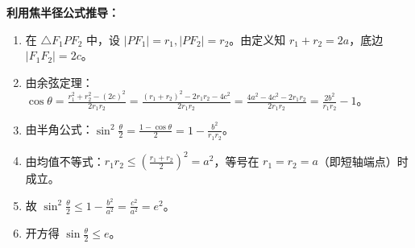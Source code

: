 \begin{proofbox}
\textbf{利用焦半径公式推导：}
\begin{enumerate}
    \item 在 $\triangle F_1PF_2$ 中，设 $|PF_1|=r_1, |PF_2|=r_2$。由定义知 $r_1+r_2=2a$，底边 $|F_1F_2|=2c$。
    \item 由余弦定理：$\cos\theta = \frac{r_1^2 + r_2^2 - (2c)^2}{2r_1r_2} = \frac{(r_1+r_2)^2 - 2r_1r_2 - 4c^2}{2r_1r_2} = \frac{4a^2 - 4c^2 - 2r_1r_2}{2r_1r_2} = \frac{2b^2}{r_1r_2} - 1$。
    \item 由半角公式：$\sin^2 \frac{\theta}{2} = \frac{1-\cos\theta}{2} = 1 - \frac{b^2}{r_1r_2}$。
    \item 由均值不等式：$r_1r_2 \le (\frac{r_1+r_2}{2})^2 = a^2$，等号在 $r_1=r_2=a$（即短轴端点）时成立。
    \item 故 $\sin^2 \frac{\theta}{2} \le 1 - \frac{b^2}{a^2} = \frac{c^2}{a^2} = e^2$。
    \item 开方得 $\sin \frac{\theta}{2} \le e$。
\end{enumerate}
\end{proofbox}